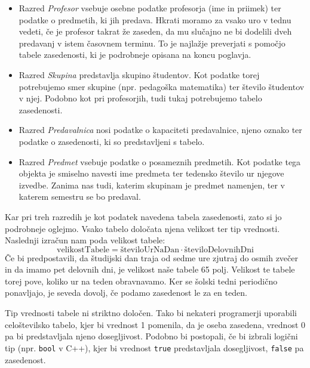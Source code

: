 \documentclass[a4paper,10pt]{article}
\begin{document}
\begin{itemize}
   

   \item Razred \emph{Profesor} vsebuje osebne podatke profesorja (ime in priimek) ter
   podatke o predmetih, ki jih predava. Hkrati moramo za vsako uro v tednu vedeti, če
   je profesor takrat že zaseden, da mu slučajno ne bi dodelili dveh predavanj v istem
   časovnem terminu. To je najlažje preverjati s pomočjo tabele zasedenosti, ki je
   podrobneje opisana na koncu poglavja.

   \item Razred \emph{Skupina} predstavlja skupino študentov. Kot podatke torej potrebujemo
   smer skupine (npr. pedagoška matematika) ter število študentov v njej. Podobno kot pri
   profesorjih, tudi tukaj potrebujemo tabelo zasedenosti.

  \item Razred \emph{Predavalnica} nosi podatke o kapaciteti predavalnice, njeno oznako
   ter podatke o zasedenosti, ki so predstavljeni s tabelo.

  \item Razred \emph{Predmet} vsebuje podatke o posameznih predmetih. Kot podatke tega
   objekta je smiselno navesti ime predmeta ter tedensko število ur njegove izvedbe.
   Zanima nas tudi, katerim skupinam je predmet namenjen, ter v katerem semestru se bo
   predaval.


\end{itemize}
\noindent
Kar pri treh razredih je kot podatek navedena tabela zasedenosti, zato si jo podrobneje
oglejmo. Vsako tabelo določata njena velikost ter tip vrednosti. Naslednji izračun nam
poda velikost tabele:
$$ \text{velikostTabele} = \text{številoUrNaDan} \cdot \text{številoDelovnihDni}$$
Če bi predpostavili, da študijski dan traja od sedme ure zjutraj do osmih zvečer in da
imamo pet delovnih dni, je velikost naše tabele 65 polj. Velikost te tabele torej pove,
koliko ur na teden obravnavamo. Ker se šolski tedni periodično ponavljajo, je seveda
dovolj, če podamo zasedenost le za en teden.



Tip vrednosti tabele ni striktno določen. Tako bi nekateri programerji uporabili
celoštevilsko tabelo, kjer bi vrednost 1 pomenila, da je oseba zasedena, vrednost 0
pa bi predstavljala njeno dosegljivost. Podobno bi postopali, če bi izbrali logični
tip (npr. \texttt{bool} v C++), kjer bi vrednost \texttt{true} predstavljala
dosegljivost, \texttt{false} pa zasedenost.
\end{document}
